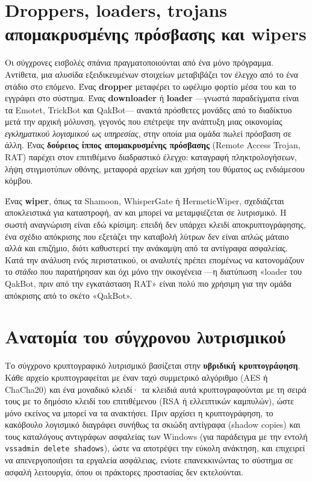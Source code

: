 \documentclass[11pt,openany]{book}
\begin{document}
\section{Droppers, loaders, trojans απομακρυσμένης πρόσβασης και wipers}\label{sec:4.4}
Οι σύγχρονες εισβολές σπάνια πραγματοποιούνται από ένα μόνο πρόγραμμα. Αντίθετα, μια αλυσίδα εξειδικευμένων στοιχείων μεταβιβάζει τον έλεγχο από το ένα στάδιο στο επόμενο. Ένας \textbf{dropper} μεταφέρει το ωφέλιμο φορτίο μέσα του και το εγγράφει στο σύστημα. Ένας \textbf{downloader} ή \textbf{loader} —γνωστά παραδείγματα είναι τα Emotet, TrickBot και QakBot— ανακτά πρόσθετες μονάδες από το διαδίκτυο μετά την αρχική μόλυνση, γεγονός που επέτρεψε την ανάπτυξη μιας οικονομίας \emph{εγκληματικού λογισμικού ως υπηρεσίας}, στην οποία μια ομάδα πωλεί πρόσβαση σε άλλη. Ένας \textbf{δούρειος ίππος απομακρυσμένης πρόσβασης} (Remote Access Trojan, RAT) παρέχει στον επιτιθέμενο διαδραστικό έλεγχο: καταγραφή πληκτρολογήσεων, λήψη στιγμιοτύπων οθόνης, μεταφορά αρχείων και χρήση του θύματος ως ενδιάμεσου κόμβου.

Ένας \textbf{wiper}, όπως τα Shamoon, WhisperGate ή HermeticWiper, σχεδιάζεται αποκλειστικά για καταστροφή, αν και μπορεί να μεταμφιέζεται σε λυτρισμικό. Η σωστή αναγνώριση είναι εδώ κρίσιμη: επειδή δεν υπάρχει κλειδί αποκρυπτογράφησης, ένα σχέδιο απόκρισης που εξετάζει την καταβολή λύτρων δεν είναι απλώς μάταιο αλλά και επιζήμιο, διότι καθυστερεί την ανάκαμψη από τα αντίγραφα ασφαλείας. Κατά την ανάλυση ενός περιστατικού, οι αναλυτές πρέπει επομένως να κατονομάζουν το \emph{στάδιο} που παρατήρησαν και όχι μόνο την οικογένεια —η διατύπωση «loader του QakBot, πριν από την εγκατάσταση RAT» είναι πολύ πιο χρήσιμη για την ομάδα απόκρισης από το σκέτο «QakBot».

\section{Ανατομία του σύγχρονου λυτρισμικού}\label{sec:4.5}
Το σύγχρονο κρυπτογραφικό λυτρισμικό βασίζεται στην \textbf{υβριδική κρυπτογράφηση}. Κάθε αρχείο κρυπτογραφείται με έναν ταχύ συμμετρικό αλγόριθμο (AES ή ChaCha20) και ένα μοναδικό κλειδί· τα κλειδιά αυτά κρυπτογραφούνται με τη σειρά τους με το δημόσιο κλειδί του επιτιθέμενου (RSA ή ελλειπτικών καμπυλών), ώστε μόνο εκείνος να μπορεί να τα ανακτήσει. Πριν αρχίσει η κρυπτογράφηση, το κακόβουλο λογισμικό διαγράφει συνήθως τα σκιώδη αντίγραφα (shadow copies) και τους καταλόγους αντιγράφων ασφαλείας των Windows (για παράδειγμα με την εντολή \texttt{vssadmin delete shadows}), ώστε να αποτρέψει την εύκολη ανάκτηση, και επιχειρεί να απενεργοποιήσει τα εργαλεία ασφάλειας, ενίοτε επανεκκινώντας το σύστημα σε ασφαλή λειτουργία, όπου οι πράκτορες προστασίας δεν εκτελούνται.
\end{document}
